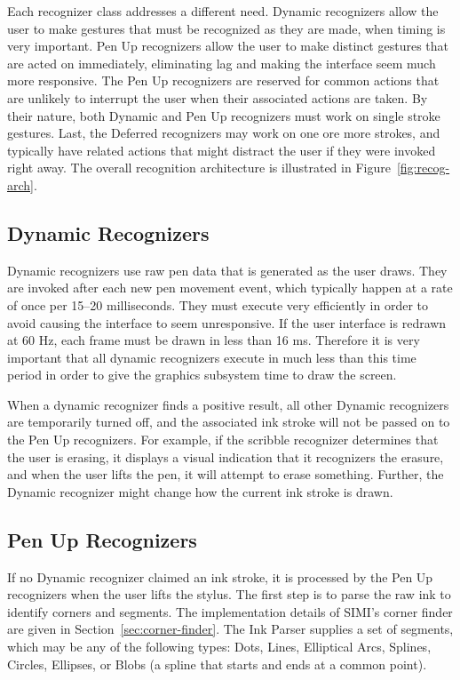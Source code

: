 

Each recognizer class addresses a different need. Dynamic recognizers
allow the user to make gestures that must be recognized as they are
made, when timing is very important. Pen Up recognizers allow the user
to make distinct gestures that are acted on immediately, eliminating
lag and making the interface seem much more responsive. The Pen Up
recognizers are reserved for common actions that are unlikely to
interrupt the user when their associated actions are taken. By their
nature, both Dynamic and Pen Up recognizers must work on single stroke
gestures. Last, the Deferred recognizers may work on one ore more
strokes, and typically have related actions that might distract the
user if they were invoked right away. The overall recognition
architecture is illustrated in Figure~\ref{fig:recog-arch}.

\subsection{Dynamic Recognizers}
\label{sec:overview-dynamic-recognizers}

Dynamic recognizers use raw pen data that is generated as the user
draws. They are invoked after each new pen movement event, which
typically happen at a rate of once per 15--20 milliseconds. They must
execute very efficiently in order to avoid causing the interface to
seem unresponsive. If the user interface is redrawn at 60 Hz, each
frame must be drawn in less than 16 ms. Therefore it is very important
that all dynamic recognizers execute in much less than this time
period in order to give the graphics subsystem time to draw the
screen.

When a dynamic recognizer finds a positive result, all other Dynamic
recognizers are temporarily turned off, and the associated ink stroke
will not be passed on to the Pen Up recognizers. For example, if the
scribble recognizer determines that the user is erasing, it displays a
visual indication that it recognizers the erasure, and when the user
lifts the pen, it will attempt to erase something. Further, the
Dynamic recognizer might change how the current ink stroke is drawn.

\subsection{Pen Up Recognizers}

If no Dynamic recognizer claimed an ink stroke, it is processed by the
Pen Up recognizers when the user lifts the stylus. The first step is
to parse the raw ink to identify corners and segments. The
implementation details of SIMI's corner finder are given in
Section~\ref{sec:corner-finder}. The Ink Parser supplies a set of
segments, which may be any of the following types: Dots, Lines,
Elliptical Arcs, Splines, Circles, Ellipses, or Blobs (a spline that
starts and ends at a common point).

